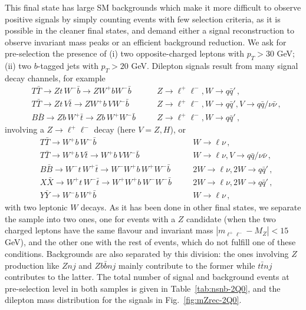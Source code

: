 \documentclass[12pt,a4paper]{article}
\newcommand{\HZ}{V}
\begin{document}
This final state has large SM backgrounds which make it more difficult to observe positive signals by simply counting events with few selection criteria, as it is possible in 
the cleaner final states, and demand either a signal reconstruction to observe invariant mass peaks or an efficient background reduction. We ask for pre-selection the presence of (i) two opposite-charged leptons with $p_T > 30$ GeV; (ii) two $b$-tagged jets with $p_T > 20$ GeV. Dilepton signals result from many signal decay channels, for example
\begin{align}
& T \bar T \to Zt \, W^- \bar b \to Z W^+b W^- \bar b
&& \quad Z \to \ell^+ \ell^- , W \to q \bar q' \,, \nonumber \\
& T \bar T \to Zt \, \HZ \bar t \to Z W^+b \, \HZ W^- \bar b
&& \quad Z \to \ell^+ \ell^- , W \to q \bar q' , \HZ \to q \bar q/\nu \bar \nu \,, \nonumber \\
& B \bar B \to Z b \, W^+ \bar t \to Z b \, W^+ W^- \bar b
&& \quad Z \to \ell^+ \ell^- , W \to q \bar q' \,, 
\label{ec:ch2Q0Z}
\end{align}
involving a $Z \to \ell^+ \ell^-$ decay (here $\HZ=Z,H$), or
\begin{align}
& T \bar T \to W^+ b \, W^- \bar b 
&& \quad W \to \ell \nu\,, \nonumber \\
& T \bar T \to W^+ b \, \HZ \bar t \to W^+ b \, \HZ W^- \bar b 
&& \quad W \to \ell \nu , \HZ \to q \bar q/\nu \bar \nu\,, \nonumber \\
& B \bar B \to W^- t \, W^+ \bar t \to W^- W^+ b \, W^+ W^- \bar b
&& \quad 2W \to \ell \nu , 2W \to q \bar q' \,, \nonumber \\
& X \bar X \to W^+ t \, W^- \bar t \to W^+ W^+ b \, W^- W^- \bar b 
&& \quad 2W \to \ell \nu , 2W \to q \bar q' \,, \nonumber \\
& Y \bar Y \to W^- b \, W^+ \bar b 
&& \quad W \to \ell \nu\,, 
\label{ec:ch2Q0noZ}
\end{align}
with two leptonic $W$ decays. 
As it has been done in other final states, we separate the sample into two ones, one for events with a $Z$ candidate (when the two charged leptons have the same flavour and invariant mass
$|m_{\ell^+ \ell^-} - M_Z| < 15$ GeV), and the other one with the rest of events, which do not fulfill one of these conditions. Backgrounds are also separated by this division: the ones involving $Z$ production like $Znj$ and $Z b \bar bnj$ mainly contribute to the former while $t \bar t nj$ contributes to the latter. 
The total number of signal and background events at pre-selection level in both samples is given in Table~\ref{tab:nsnb-2Q0}, and the dilepton mass distribution for the signals in Fig.~\ref{fig:mZrec-2Q0}.
\end{document}
